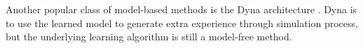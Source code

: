 Another popular class of model-based methods is the Dyna architecture \cite{Dyna}.
Dyna \cite{Dyna} is to use the learned model to generate extra experience through
simulation process, but the underlying learning algorithm is still a model-free method.





